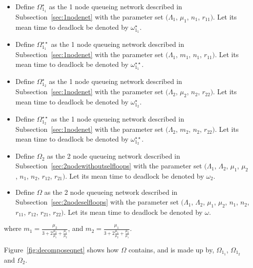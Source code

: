 \documentclass{article}
\numberwithin{equation}{section}
\begin{document}
\begin{itemize}
  \item Define $\Omega_{1_1}^{\star}$ as the 1 node queueing network described in Subsection~\ref{sec:1nodenet} with the parameter set $(\Lambda_1$, $\mu_1$, $n_1$, $r_{11})$. Let its mean time to deadlock be denoted by $\omega_{1_1}^{\star}$.
  \item Define $\Omega_{1_1}^{\star\star}$ as the 1 node queueing network described in Subsection~\ref{sec:1nodenet} with the parameter set $(\Lambda_1$, $m_1$, $n_1$, $r_{11})$. Let its mean time to deadlock be denoted by $\omega_{1_1}^{\star\star}$.
  \item Define $\Omega_{1_2}^{\star}$ as the 1 node queueing network described in Subsection~\ref{sec:1nodenet} with the parameter set $(\Lambda_2$, $\mu_2$, $n_2$, $r_{22})$. Let its mean time to deadlock be denoted by $\omega_{1_2}^{\star}$.
  \item Define $\Omega_{1_2}^{\star\star}$ as the 1 node queueing network described in Subsection~\ref{sec:1nodenet} with the parameter set $(\Lambda_2$, $m_2$, $n_2$, $r_{22})$. Let its mean time to deadlock be denoted by $\omega_{1_2}^{\star\star}$.
  \item Define $\Omega_2$ as the 2 node queueing network described in Subsection~\ref{sec:2nodewithoutselfloops} with the parameter set $(\Lambda_1$, $\Lambda_2$, $\mu_1$, $\mu_2$, $n_1$, $n_2$, $r_{12}$, $r_{21})$. Let its mean time to deadlock be denoted by $\omega_2$.
  \item Define $\Omega$ as the 2 node queueing network described in Subsection~\ref{sec:2nodeselfloops} with the parameter set $(\Lambda_1$, $\Lambda_2$, $\mu_1$, $\mu_2$, $n_1$, $n_2$, $r_{11}$, $r_{12}$, $r_{21}$, $r_{22})$. Let its mean time to deadlock be denoted by $\omega$.
\end{itemize}
where $m_1 = \frac{\mu_2}{3 + 2\frac{\mu_2}{\mu_1} + \frac{\mu_1}{\mu_2}}$, and $m_2 = \frac{\mu_1}{3 + 2\frac{\mu_1}{\mu_2} + \frac{\mu_2}{\mu_1}}$.

Figure~\ref{fig:decomposeqnet} shows how $\Omega$ contains, and is made up by, $\Omega_{1_1}$, $\Omega_{1_2}$ and $\Omega_2$.
\end{document}
